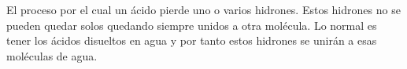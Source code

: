 \documentclass[11pt, a4paper]{article}
\begin{document}

El proceso por el cual un ácido pierde uno o varios hidrones. Estos hidrones no se pueden quedar solos quedando siempre unidos a otra molécula. Lo normal es tener los ácidos disueltos en agua y por tanto estos hidrones se unirán a esas moléculas de agua.
\begin{center}
    \\
    \\
    \\
    \\
    \\
\end{center}

\end{document}
